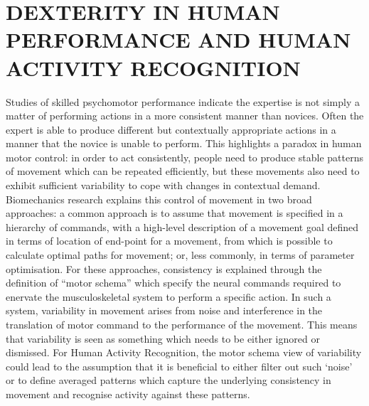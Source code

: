 \documentclass{sigchi}
\begin{document}
\section{DEXTERITY IN HUMAN PERFORMANCE AND HUMAN ACTIVITY RECOGNITION}
Studies of skilled psychomotor performance indicate the expertise is not simply a matter of performing actions 
in a more consistent manner than novices.  Often the expert is able to produce different but contextually
appropriate actions in a manner that the novice is unable to perform.  This highlights a paradox in human motor 
control: in order to act consistently, people need to produce stable patterns of movement which can be repeated 
efficiently, but these movements also need to exhibit sufficient variability to cope with changes in contextual 
demand. Biomechanics research explains this control of movement in two broad approaches: a common approach is 
to assume that movement is specified in a hierarchy of commands, with a high-level description of a movement 
goal defined in terms of location of end-point for a movement, from which is possible to calculate optimal paths 
for movement; or, less commonly, in terms of parameter optimisation.  For these approaches, consistency is 
explained through the definition of ``motor schema'' which specify the neural commands required to enervate 
the musculoskeletal system to perform a specific action. In such a system, variability in movement arises 
from noise and interference in the translation of motor command to the performance of the movement.  
This means that variability is seen as something which needs to be either ignored or dismissed.  
For Human Activity Recognition, the motor schema view of variability could lead to the assumption that it is 
beneficial to either filter out such ‘noise’ or to define averaged patterns which capture the underlying 
consistency in movement and recognise activity against these patterns. 
\end{document}
